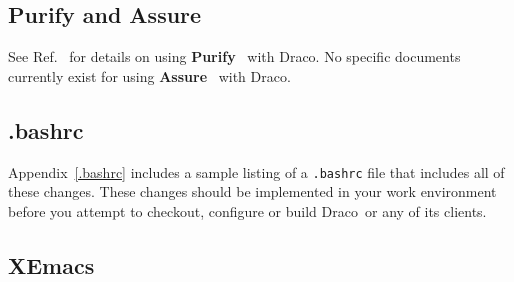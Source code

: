\documentclass[10pt]{nmemo}
\newcommand{\comp}[1]{\normalfont\normalsize\texttt{#1}}
\newcommand{\draco}{{\normalfont\sffamily Draco}}
\newcommand{\xemacs}{{\normalfont\bfseries XEmacs}}
\begin{document}







\subsection{Purify and Assure}

See Ref.~\cite{draco-purify} for details on using
\textbf{Purify}~\cite{purify} with \draco.  No specific documents
currently exist for using \textbf{Assure}~\cite{assure} with \draco.

\subsection{.bashrc}

Appendix~\ref{.bashrc} includes a sample listing of a \comp{.bashrc}
file that includes all of these changes.  These changes should be
implemented in your work environment before you attempt to checkout,
configure or build \draco\ or any of its clients.

\subsection{\xemacs}
\end{document}
